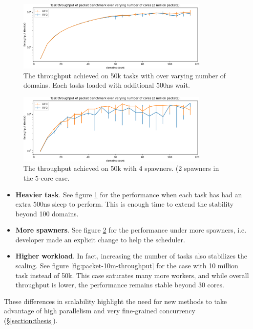 \documentclass[12pt,a4paper,twoside]{report}
\begin{document}
\begin{figure} 
     \centering
     \includegraphics[width=0.85\textwidth]{eval/packet-basic-slowed_2.png}
     \caption{The throughput achieved on 50k tasks with over varying number of domains. Each tasks loaded with additional 500ns wait.}
    \label{fig:packet-slowed}
\end{figure}


\begin{figure} 
     \centering 
     \includegraphics[width=0.85\textwidth]{eval/packet-basic-4spawners-just-throughput.png}
     \caption{The throughput achieved on 50k with 4 spawners. (2 spawners in the 5-core case.}
    \label{fig:packet-4spawners}
\end{figure}

\begin{itemize}
    \item \textbf{Heavier task}. See figure \ref{fig:packet-slowed} for the performance when each task has had an extra 500ns sleep to perform. This is enough time to extend the stability beyond 100 domains.
    \item \textbf{More spawners}. See figure \ref{fig:packet-4spawners} for the performance under more spawners, i.e. developer made an explicit change to help the scheduler.
    \item \textbf{Higher workload}. In fact, increasing the number of tasks also stabilizes the scaling. See figure \ref{fig:packet-10m-throughput} for the case with 10 million task instead of 50k. This case saturates many more workers, and while overall throughput is lower, the performance remains stable beyond 30 cores. 
\end{itemize}
These differences in scalability highlight the need for new methods to take advantage of high parallelism and very fine-grained concurrency (\S\ref{section:thesis}).
\end{document}
